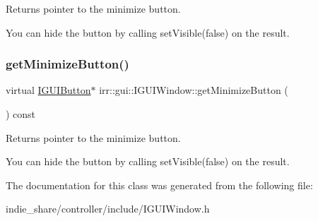 Returns pointer to the minimize button. 

You can hide the button by calling set\+Visible(false) on the result. \mbox{\label{classirr_1_1gui_1_1IGUIWindow_a9c9b5060ca57c46bfece1339ef30facb}} 
\subsubsection{\texorpdfstring{get\+Minimize\+Button()}{getMinimizeButton()}\hspace{0.1cm}{\footnotesize\ttfamily [2/2]}}
{\footnotesize\ttfamily virtual \hyperlink{classirr_1_1gui_1_1IGUIButton}{I\+G\+U\+I\+Button}$\ast$ irr\+::gui\+::\+I\+G\+U\+I\+Window\+::get\+Minimize\+Button (\begin{DoxyParamCaption}{ }\end{DoxyParamCaption}) const\hspace{0.3cm}{\ttfamily [pure virtual]}}



Returns pointer to the minimize button. 

You can hide the button by calling set\+Visible(false) on the result. 

The documentation for this class was generated from the following file\+:\begin{DoxyCompactItemize}
\item 
indie\+\_\+share/controller/include/I\+G\+U\+I\+Window.\+h\end{DoxyCompactItemize}
